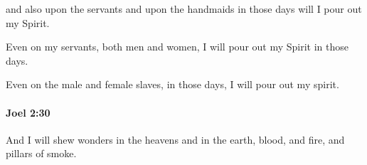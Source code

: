 			\begin{versebox}
					\item[BHS] 
					\item[LXX] 
					\item[ASV] and also upon the servants and upon the handmaids in those days will I pour out my Spirit.
					\item[NIV] Even on my servants, both men and women, I will pour out my Spirit in those days.
					\item[NRSV] Even on the male and female slaves, in those days, I will pour out my spirit.
			\end{versebox}

		\paragraph{Joel 2:30} %
			\label{JOEL-2-30}

			And I will shew wonders in the heavens and in the earth, blood, and fire, and pillars of smoke.

